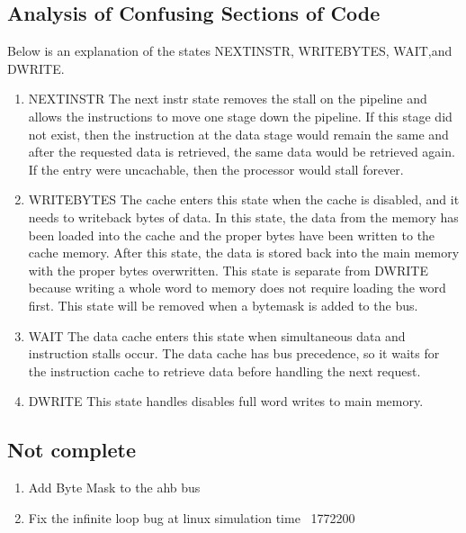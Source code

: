 \subsection{Analysis of Confusing Sections of Code}
\label{sec:dstate}

Below is an explanation of the states NEXTINSTR, WRITEBYTES, WAIT,and DWRITE.

\begin{enumerate}
	\item NEXTINSTR
	The next instr state removes the stall on the pipeline and allows the instructions to move one stage down the pipeline. If this stage did not exist, then the instruction at the data stage would remain the same and after the requested data is retrieved, the same data would be retrieved again. If the entry were uncachable, then the processor would stall forever.

	\item WRITEBYTES
	The cache enters this state when the cache is disabled, and it needs to writeback bytes of data. In this state, the data from the memory has been loaded into the cache and the proper bytes have been written to the cache memory. After this state, the data is stored back into the main memory with the proper bytes overwritten. This state is separate from DWRITE because writing a whole word to memory does not require loading the word first. This state will be removed when a bytemask is added to the bus.

	\item WAIT
	The data cache enters this state when simultaneous data and instruction stalls occur. The data cache has bus precedence, so it waits for the instruction cache to retrieve data before handling the next request. 

	\item DWRITE
	This state handles disables full word writes to main memory.
	
\end{enumerate}

\subsection{Not complete}

\begin{enumerate}
	\item Add Byte Mask to the ahb bus
	\item Fix the infinite loop bug at linux simulation time ~1772200
\end{enumerate}
